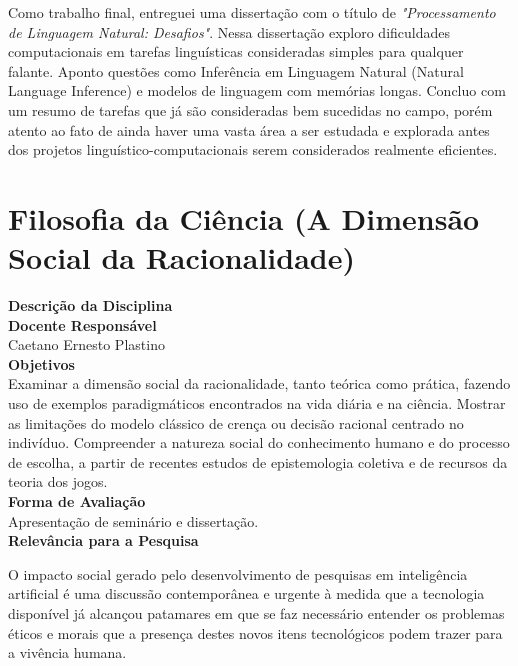 Como trabalho final, entreguei uma dissertação com o título de \textit{"Processamento de Linguagem Natural: Desafios"}. Nessa dissertação exploro dificuldades computacionais em tarefas linguísticas consideradas simples para qualquer falante. Aponto questões como Inferência em Linguagem Natural (Natural Language Inference) e modelos de linguagem com memórias longas. Concluo com um resumo de tarefas que já são consideradas bem sucedidas no campo, porém atento ao fato de ainda haver uma vasta área a ser estudada e explorada antes dos projetos linguístico-computacionais serem considerados realmente eficientes.



\section{Filosofia da Ciência (A Dimensão Social da Racionalidade)}

\textbf{\Large Descrição da Disciplina}\\

\textbf{Docente Responsável}\\
\hspace*{1.6em}Caetano Ernesto Plastino\\

\textbf{Objetivos}\\
\hspace*{1.6em}Examinar a dimensão social da racionalidade, tanto teórica como prática, fazendo uso de exemplos paradigmáticos encontrados na vida diária e na ciência. Mostrar as limitações do modelo clássico de crença ou decisão racional centrado no indivíduo. Compreender a natureza social do conhecimento humano e do processo de escolha, a partir de recentes estudos de epistemologia coletiva e de recursos da teoria dos jogos.\\

\textbf{Forma de Avaliação}\\
\hspace*{1.6em}Apresentação de seminário e dissertação.\\

\textbf{Relevância para a Pesquisa}

O impacto social gerado pelo desenvolvimento de pesquisas em inteligência artificial é uma discussão contemporânea e urgente à medida que a tecnologia disponível já alcançou patamares em que se faz necessário entender os problemas éticos e morais que a presença destes novos itens tecnológicos podem trazer para a vivência humana.\\

